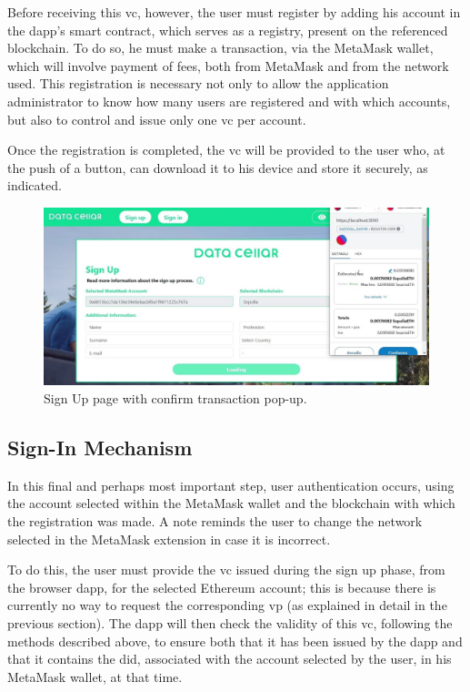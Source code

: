 Before receiving this \gls{vc}, however, the user must register by adding his account in the \gls{dapp}'s smart contract, which serves as a registry, present on the referenced 
blockchain. To do so, he must make a transaction, via the MetaMask wallet, which will involve payment of fees, both from MetaMask and from the network used. This 
registration is necessary not only to allow the application administrator to know how many users are registered and with which accounts, but also to control and issue only 
one \gls{vc} per account.



Once the registration is completed, the \gls{vc} will be provided to the user who, at the push of a button, can download it to his device and store it securely, as indicated.

\begin{figure}[h]  
  \centering
  \includegraphics[width=1\textwidth]{Images/c6_2.jpg} 
  \caption{Sign Up page with confirm transaction pop-up.}
\end{figure}


\subsection{Sign-In Mechanism}

In this final and perhaps most important step, user authentication occurs, using the account selected within the MetaMask wallet and the blockchain with which the 
registration was made. A note reminds the user to change the network selected in the MetaMask extension in case it is incorrect.

To do this, the user must provide the \gls{vc} issued during the sign up phase, from the browser \gls{dapp}, for the selected Ethereum account; this is because there is 
currently no way to request the corresponding \gls{vp} (as explained in detail in the previous section). The \gls{dapp} will then check the validity of this \gls{vc}, following the 
methods described above, to ensure both that it has been issued by the \gls{dapp} and that it contains the \gls{did}, associated with the account selected by the user, in his 
MetaMask wallet, at that time.

